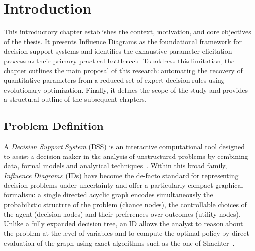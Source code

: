 
\chapter{Introduction}
\label{ch:introduction}

This introductory chapter establishes the context, motivation, and core objectives of the thesis. It presents Influence Diagrams as the foundational framework for decision support systems and identifies the exhaustive parameter elicitation process as their primary practical bottleneck. To address this limitation, the chapter outlines the main proposal of this research: automating the recovery of quantitative parameters from a reduced set of expert decision rules using evolutionary optimization. Finally, it defines the scope of the study and provides a structural outline of the subsequent chapters.

\section{Problem Definition}

A \emph{Decision Support System} (DSS) is an interactive
computational tool designed to assist a decision-maker in the analysis
of unstructured problems by combining data, formal models and
analytical techniques~\cite{insua2005}. Within
this broad family, \emph{Influence Diagrams}~(IDs)
\cite{howard2005influence,koller2009pgm,shenoy2009eolss} have become
the de-facto standard for representing decision
problems under uncertainty and offer a particularly compact
graphical formalism:
a single directed acyclic graph encodes simultaneously the
probabilistic structure of the problem (chance nodes), the
controllable choices of the agent (decision nodes) and their
preferences over outcomes (utility nodes). Unlike a fully expanded
decision tree, an ID allows the analyst to reason about the problem
at the level of variables and to compute the optimal policy by direct
evaluation of the graph using exact algorithms such as the one of
Shachter~\cite{shachter1986evaluating}.

